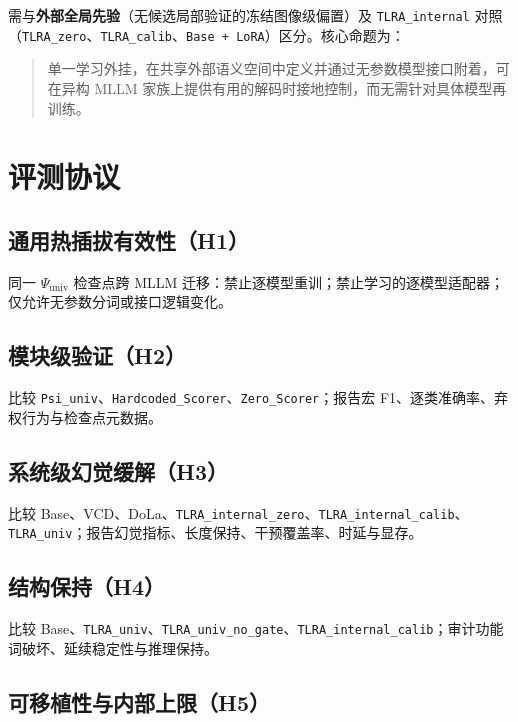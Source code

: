 需与\textbf{外部全局先验}（无候选局部验证的冻结图像级偏置）及 \texttt{TLRA\_internal} 对照（\texttt{TLRA\_zero}、\texttt{TLRA\_calib}、\texttt{Base + LoRA}）区分。核心命题为：

\begin{quote}
单一学习外挂，在共享外部语义空间中定义并通过无参数模型接口附着，可在异构 MLLM 家族上提供有用的解码时接地控制，而无需针对具体模型再训练。
\end{quote}

\section{评测协议}
\label{sec:eval}

\subsection{通用热插拔有效性（H1）}

同一 $\Psi_{\mathrm{univ}}$ 检查点跨 MLLM 迁移：禁止逐模型重训；禁止学习的逐模型适配器；仅允许无参数分词或接口逻辑变化。

\subsection{模块级验证（H2）}

比较 \texttt{Psi\_univ}、\texttt{Hardcoded\_Scorer}、\texttt{Zero\_Scorer}；报告宏 F1、逐类准确率、弃权行为与检查点元数据。

\subsection{系统级幻觉缓解（H3）}

比较 Base、VCD、DoLa、\texttt{TLRA\_internal\_zero}、\texttt{TLRA\_internal\_calib}、\texttt{TLRA\_univ}；报告幻觉指标、长度保持、干预覆盖率、时延与显存。

\subsection{结构保持（H4）}

比较 Base、\texttt{TLRA\_univ}、\texttt{TLRA\_univ\_no\_gate}、\texttt{TLRA\_internal\_calib}；审计功能词破坏、延续稳定性与推理保持。

\subsection{可移植性与内部上限（H5）}


